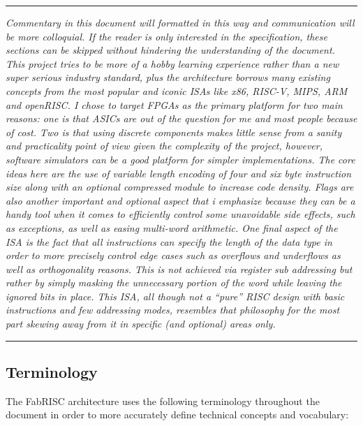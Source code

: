 \documentclass{article}
\begin{document}
        \par\noindent\rule{\textwidth}{0.4pt}
        \textit{Commentary in this document will formatted in this way and communication will be more colloquial. If the reader is only interested in the specification, these sections can be skipped without hindering the understanding of the document. This project tries to be more of a hobby learning experience rather than a new super serious industry standard, plus the architecture borrows many existing concepts from the most popular and iconic ISAs like x86, RISC-V, MIPS, ARM and openRISC. I chose to target FPGAs as the primary platform for two main reasons: one is that ASICs are out of the question for me and most people because of cost. Two is that using discrete components makes little sense from a sanity and practicality point of view given the complexity of the project, however, software simulators can be a good platform for simpler implementations. The core ideas here are the use of variable length encoding of four and six byte instruction size along with an optional compressed module to increase code density. Flags are also another important and optional aspect that i emphasize because they can be a handy tool when it comes to efficiently control some unavoidable side effects, such as exceptions, as well as easing multi-word arithmetic. One final aspect of the ISA is the fact that all instructions can specify the length of the data type in order to more precisely control edge cases such as overflows and underflows as well as orthogonality reasons. This is not achieved via register sub addressing but rather by simply masking the unnecessary portion of the word while leaving the ignored bits in place. This ISA, all though not a ``pure'' RISC design with basic instructions and few addressing modes, resembles that philosophy for the most part skewing away from it in specific (and optional) areas only.}
        \par\noindent\rule{\textwidth}{0.4pt}

        \subsection[Terminology]{Terminology}

            The FabRISC architecture uses the following terminology throughout the document in order to more accurately define technical concepts and vocabulary:
\end{document}
